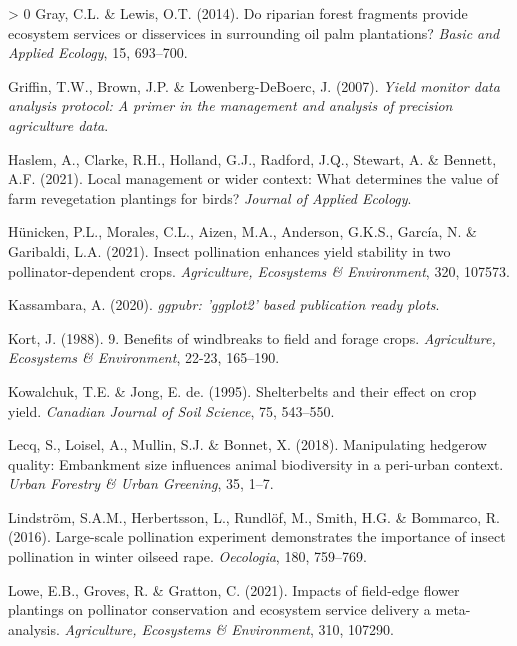\documentclass[]{elsarticle} %
\newlength{\cslhangindent}
\newenvironment{CSLReferences}[3] %
 {%
  \setlength{\parindent}{0pt}
  \ifodd #1 \everypar{\setlength{\hangindent}{\cslhangindent}}\ignorespaces\fi
  \ifnum #2 > 0
  \setlength{\parskip}{#2\baselineskip}
  \fi
 }%
 {}
\begin{document}
\begin{CSLReferences}{1}{0}
\leavevmode\hypertarget{ref-gray2014}{}%
Gray, C.L. \& Lewis, O.T. (2014). Do riparian forest fragments provide ecosystem services or disservices in surrounding oil palm plantations? \emph{Basic and Applied Ecology}, 15, 693--700.

\leavevmode\hypertarget{ref-griffin2007}{}%
Griffin, T.W., Brown, J.P. \& Lowenberg-DeBoerc, J. (2007). \emph{Yield monitor data analysis protocol: A primer in the management and analysis of precision agriculture data}.

\leavevmode\hypertarget{ref-haslem2021}{}%
Haslem, A., Clarke, R.H., Holland, G.J., Radford, J.Q., Stewart, A. \& Bennett, A.F. (2021). Local management or wider context: What determines the value of farm revegetation plantings for birds? \emph{Journal of Applied Ecology}.

\leavevmode\hypertarget{ref-hunicken2021}{}%
Hünicken, P.L., Morales, C.L., Aizen, M.A., Anderson, G.K.S., García, N. \& Garibaldi, L.A. (2021). Insect pollination enhances yield stability in two pollinator-dependent crops. \emph{Agriculture, Ecosystems {\&} Environment}, 320, 107573.

\leavevmode\hypertarget{ref-kassambara2020}{}%
Kassambara, A. (2020). \emph{{ggpubr}: 'ggplot2' based publication ready plots}.

\leavevmode\hypertarget{ref-kort1988}{}%
Kort, J. (1988). 9. Benefits of windbreaks to field and forage crops. \emph{Agriculture, Ecosystems {\&} Environment}, 22-23, 165--190.

\leavevmode\hypertarget{ref-kowalchuk1995}{}%
Kowalchuk, T.E. \& Jong, E. de. (1995). Shelterbelts and their effect on crop yield. \emph{Canadian Journal of Soil Science}, 75, 543--550.

\leavevmode\hypertarget{ref-lecq2018}{}%
Lecq, S., Loisel, A., Mullin, S.J. \& Bonnet, X. (2018). Manipulating hedgerow quality: Embankment size influences animal biodiversity in a peri-urban context. \emph{Urban Forestry {\&} Urban Greening}, 35, 1--7.

\leavevmode\hypertarget{ref-lindstrom2016}{}%
Lindström, S.A.M., Herbertsson, L., Rundlöf, M., Smith, H.G. \& Bommarco, R. (2016). Large-scale pollination experiment demonstrates the importance of insect pollination in winter oilseed rape. \emph{Oecologia}, 180, 759--769.

\leavevmode\hypertarget{ref-lowe2021}{}%
Lowe, E.B., Groves, R. \& Gratton, C. (2021). Impacts of field-edge flower plantings on pollinator conservation and ecosystem service delivery {{}} a meta-analysis. \emph{Agriculture, Ecosystems {\&} Environment}, 310, 107290.


\end{CSLReferences}
\end{document}
